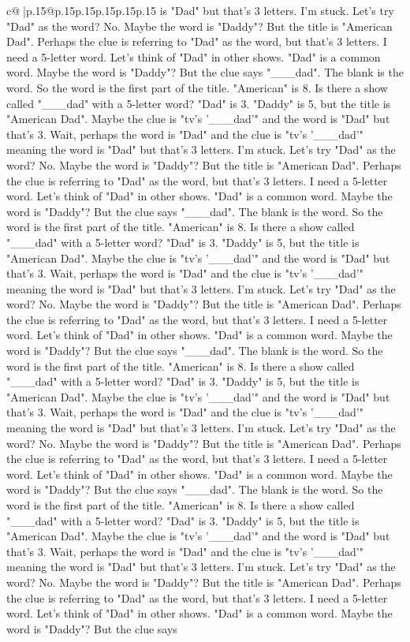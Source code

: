 \documentclass{article}
\begin{document}
{\begin{supertabular}{c@{$\;$}|p{.15\linewidth}@{}p{.15\linewidth}p{.15\linewidth}p{.15\linewidth}p{.15\linewidth}p{.15\linewidth}}
{{{is "Dad" but that's 3 letters. I'm stuck. Let's try "Dad" as the word? No. Maybe the word is "Daddy"? But the title is "American Dad". Perhaps the clue is referring to "Dad" as the word, but that's 3 letters. I need a 5{-}letter word. Let's think of "Dad" in other shows. "Dad" is a common word. Maybe the word is "Daddy"? But the clue says "\_\_\_dad". The blank is the word. So the word is the first part of the title. "American" is 8. Is there a show called "\_\_\_dad" with a 5{-}letter word? "Dad" is 3. "Daddy" is 5, but the title is "American Dad". Maybe the clue is "tv's '\_\_\_dad'" and the word is "Dad" but that's 3. Wait, perhaps the word is "Dad" and the clue is "tv's '\_\_\_dad'" meaning the word is "Dad" but that's 3 letters. I'm stuck. Let's try "Dad" as the word? No. Maybe the word is "Daddy"? But the title is "American Dad". Perhaps the clue is referring to "Dad" as the word, but that's 3 letters. I need a 5{-}letter word. Let's think of "Dad" in other shows. "Dad" is a common word. Maybe the word is "Daddy"? But the clue says "\_\_\_dad". The blank is the word. So the word is the first part of the title. "American" is 8. Is there a show called "\_\_\_dad" with a 5{-}letter word? "Dad" is 3. "Daddy" is 5, but the title is "American Dad". Maybe the clue is "tv's '\_\_\_dad'" and the word is "Dad" but that's 3. Wait, perhaps the word is "Dad" and the clue is "tv's '\_\_\_dad'" meaning the word is "Dad" but that's 3 letters. I'm stuck. Let's try "Dad" as the word? No. Maybe the word is "Daddy"? But the title is "American Dad". Perhaps the clue is referring to "Dad" as the word, but that's 3 letters. I need a 5{-}letter word. Let's think of "Dad" in other shows. "Dad" is a common word. Maybe the word is "Daddy"? But the clue says "\_\_\_dad". The blank is the word. So the word is the first part of the title. "American" is 8. Is there a show called "\_\_\_dad" with a 5{-}letter word? "Dad" is 3. "Daddy" is 5, but the title is "American Dad". Maybe the clue is "tv's '\_\_\_dad'" and the word is "Dad" but that's 3. Wait, perhaps the word is "Dad" and the clue is "tv's '\_\_\_dad'" meaning the word is "Dad" but that's 3 letters. I'm stuck. Let's try "Dad" as the word? No. Maybe the word is "Daddy"? But the title is "American Dad". Perhaps the clue is referring to "Dad" as the word, but that's 3 letters. I need a 5{-}letter word. Let's think of "Dad" in other shows. "Dad" is a common word. Maybe the word is "Daddy"? But the clue says "\_\_\_dad". The blank is the word. So the word is the first part of the title. "American" is 8. Is there a show called "\_\_\_dad" with a 5{-}letter word? "Dad" is 3. "Daddy" is 5, but the title is "American Dad". Maybe the clue is "tv's '\_\_\_dad'" and the word is "Dad" but that's 3. Wait, perhaps the word is "Dad" and the clue is "tv's '\_\_\_dad'" meaning the word is "Dad" but that's 3 letters. I'm stuck. Let's try "Dad" as the word? No. Maybe the word is "Daddy"? But the title is "American Dad". Perhaps the clue is referring to "Dad" as the word, but that's 3 letters. I need a 5{-}letter word. Let's think of "Dad" in other shows. "Dad" is a common word. Maybe the word is "Daddy"? But the clue says }}}
\end{supertabular}}
\end{document}

